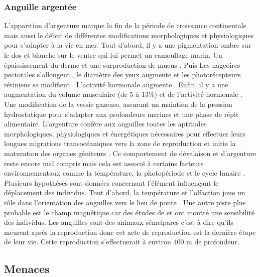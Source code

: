 \documentclass[11pt,titlepage,twoside]{article}\usepackage[]{graphicx}\usepackage[table]{xcolor}
\begin{document}
\subsubsection{Anguille argentée }


L’apparition d’argenture marque la fin de la période de croissance continentale mais aussi le début de différentes modifications morphologiques et physiologiques pour s’adapter à la vie en mer. Tout d’abord, il y a une pigmentation ombre sur le dos et blanche sur le ventre qui lui permet un camouflage marin. Un épaississement du derme et une surproduction de mucus \citep{saglio_structural_1988}.  Puis Les nageoires pectorales s’allongent \citep{durif_migration_2003}, le diamètre des yeux augmente et les photorécepteurs rétiniens se modifient \citep{adam_anguille_1997}. L’activité hormonale augmente \citep{lecomte-finiger_metamorphose_1990, pankhurst_structure_2006}. Enfin, il y a une augmentation du volume musculaire (de 5 à 13\%) et de l’activité hormonale \citep{lecomte-finiger_metamorphose_1990, pankhurst_structure_2006}. Une modification de la vessie gazeuse, assurant un maintien de la pression hydrostatique pour s’adapter aux profondeurs marines \citep{lecomte-finiger_metamorphose_1990} et une phase de répit alimentaire. L’argenture confère aux anguilles toutes les aptitudes morphologiques, physiologiques et énergétiques nécessaires pour effectuer leurs longues migrations transocéaniques vers la zone de reproduction et initie la maturation des organes géniteurs \citep{durif_durif_2009}. Ce comportement de dévalaison et d’argenture reste encore mal compris mais cela est associé à certains facteurs environnementaux comme la température, la photopériode et le cycle lunaire \citep{bruijs_silver_2009}. Plusieurs hypothèses sont données concernant l’élément influençant le déplacement des individus. Tout d’abord, la température et l’olfaction joue un rôle dans l’orientation des anguilles vers le lieu de ponte \citep{westin_orientation_1990}. Une autre piste plus probable est le champ magnétique car des études de \citep{nishi_magnetic_2004} et \citep{wu_neural_2012} ont montré une sensibilité des individus. Les anguilles sont des animaux sémelpares c’est à dire qu’ils meurent après la reproduction donc cet acte de reproduction est la dernière étape de leur vie. Cette reproduction s’effectuerait à environ 400 m de profondeur.

\subsection{Menaces }
\end{document}
